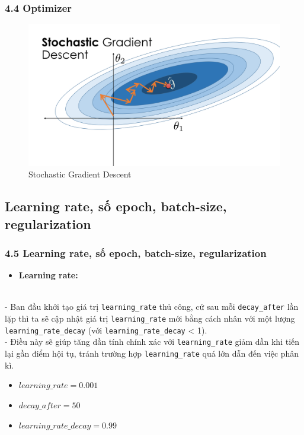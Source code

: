 \documentclass{beamer}
\begin{document}
\begin{frame}
\frametitle{4.4 Optimizer}
\begin{figure}
    \centering
    \includegraphics[width=1\linewidth]{images/SGD.png}
    \caption{Stochastic Gradient Descent}
    
\end{figure}
\end{frame}

\subsection{Learning rate, số epoch, batch-size, regularization} 

\begin{frame}
\frametitle{4.5 Learning rate, số epoch, batch-size, regularization}
\begin{itemize}
    \item \textbf{Learning rate:} 
\end{itemize}
    \\- Ban đầu khởi tạo giá trị \texttt{learning\_rate} thủ công, cứ sau mỗi \texttt{decay\_after} lần lặp thì ta sẽ cập nhật giá trị \texttt{learning\_rate} mới bằng cách nhân với một lượng \texttt{learning\_rate\_decay} (với \texttt{learning\_rate\_decay} < 1). 
    \\- Điều này sẽ giúp tăng dần tính chính xác với \texttt{learning\_rate} giảm dần khi tiến lại gần điểm hội tụ, tránh trường hợp \texttt{learning\_rate} quá lớn dẫn đến việc phân kì. 
    \begin{itemize}
        \item $learning\_rate = 0.001$
        \item $decay\_after = 50$
        \item $learning\_rate\_decay = 0.99$
    \end{itemize}
    
\end{frame}
\end{document}
